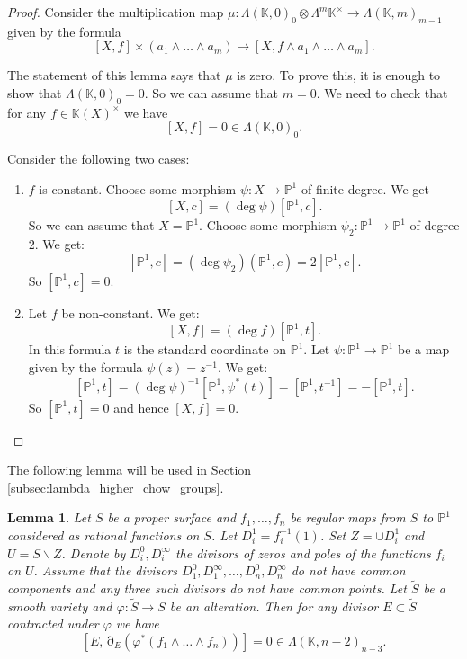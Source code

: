 \documentclass[12pt]{extarticle}
\newtheorem{lemma}[theorem]{Lemma}
\def\mb{\mathbb}
\def\L{\Lambda}
\def\k{\mb K}
\def\ph{\varphi}
\def\wt{\widetilde}
\renewcommand{\P}{{\mb P}}
\def\wdw{\wedge\dots\wedge}
\def\bs{\backslash}
\DeclareMathOperator{\ts}{\partial}
\begin{document}
\begin{proof} 
Consider the multiplication map $\mu\colon \Lambda(\k,0)_0\otimes\Lambda^{m}\k^\times\to \L(\k,m)_{m-1}$ given by the formula
$$[X,f]\times (a_1\wdw a_{m})\mapsto[X,f\wedge a_1\wdw a_{m}].$$

The statement of this lemma says that $\mu$ is zero. To prove this, it is enough to show that $\Lambda(\k,0)_0=0$. So we can assume that $m=0$. We need to check that for any $f\in\k(X)^\times$ we have
$$[X,f]=0\in \Lambda(\k,0)_0.$$

Consider the following two cases:

\begin{enumerate}
    \item $f$ is constant. Choose some morphism $\psi\colon X\to\P^1$ of finite degree. We get
    $$[X,c]=(\deg \psi)[\P^1, c].$$
    So we can assume that $X=\P^1$. Choose some morphism $\psi_2\colon \P^1\to\P^1$ of degree $2$. We get:
    $$[\P^1,c]=(\deg \psi_2)(\P^1,c)=2[\P^1,c].$$
    So $[\P^1,c]=0$.

    \item Let $f$ be non-constant. We get:
    $$[X,f]=(\deg f)[\P^1,t].$$
    In this formula $t$ is the standard coordinate on $\P^1$. Let $\psi\colon \P^1\to\P^1$ be a map given by the formula $\psi(z)=z^{-1}$. We get:
    $$[\P^1,t]=(\deg \psi)^{-1}[\P^1,\psi^*(t)]=[\P^1, t^{-1}]=-[\P^1,t].$$
    So $[\P^1,t]=0$ and hence $[X,f]=0$.
\end{enumerate}
\end{proof}




The following lemma will be used in Section \ref{subsec:lambda_higher_chow_groups}.

\begin{lemma}
\label{lemma:differential_exceptional_divisor_zero_Bloch}
    Let $S$ be a proper surface and $f_1,\dots, f_n$ be regular maps from $S$ to $\mathbb P^1$ considered as rational functions on $S$. Let $D_i^1=f_i^{-1}(1)$. Set $Z=\cup D_i^1$ and $U=S\bs Z$. Denote by $D_i^0, D_i^\infty$ the divisors of zeros and poles of the functions $f_i$ on $U$. Assume that the divisors $D_1^0, D_1^\infty,\dots, D_n^0, D_n^\infty$ do not have common components and any three such divisors do not have common points. Let $\wt S$ be a smooth variety and $\ph\colon \wt S\to S$ be an alteration. Then for any divisor $E\subset \wt S$ contracted under $\ph$ we have $$[E, \ts_E(\ph^*(f_1\wdw f_n))]=0\in \L(\k, n-2)_{n-3}.$$

\end{lemma}
\end{document}
